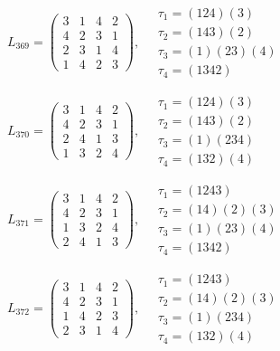 $L_{369} = \begin{pmatrix} 3 & 1 & 4 & 2 \\ 4 & 2 & 3 & 1 \\ 2 & 3 & 1 & 4 \\ 1 & 4 & 2 & 3 \end{pmatrix}, \quad \begin{matrix} \tau_{1} = (1 2 4)(3) \\ \tau_{2} = (1 4 3)(2) \\ \tau_{3} = (1)(2 3)(4) \\ \tau_{4} = (1 3 4 2) \end{matrix}$

$L_{370} = \begin{pmatrix} 3 & 1 & 4 & 2 \\ 4 & 2 & 3 & 1 \\ 2 & 4 & 1 & 3 \\ 1 & 3 & 2 & 4 \end{pmatrix}, \quad \begin{matrix} \tau_{1} = (1 2 4)(3) \\ \tau_{2} = (1 4 3)(2) \\ \tau_{3} = (1)(2 3 4) \\ \tau_{4} = (1 3 2)(4) \end{matrix}$

$L_{371} = \begin{pmatrix} 3 & 1 & 4 & 2 \\ 4 & 2 & 3 & 1 \\ 1 & 3 & 2 & 4 \\ 2 & 4 & 1 & 3 \end{pmatrix}, \quad \begin{matrix} \tau_{1} = (1 2 4 3) \\ \tau_{2} = (1 4)(2)(3) \\ \tau_{3} = (1)(2 3)(4) \\ \tau_{4} = (1 3 4 2) \end{matrix}$

$L_{372} = \begin{pmatrix} 3 & 1 & 4 & 2 \\ 4 & 2 & 3 & 1 \\ 1 & 4 & 2 & 3 \\ 2 & 3 & 1 & 4 \end{pmatrix}, \quad \begin{matrix} \tau_{1} = (1 2 4 3) \\ \tau_{2} = (1 4)(2)(3) \\ \tau_{3} = (1)(2 3 4) \\ \tau_{4} = (1 3 2)(4) \end{matrix}$

